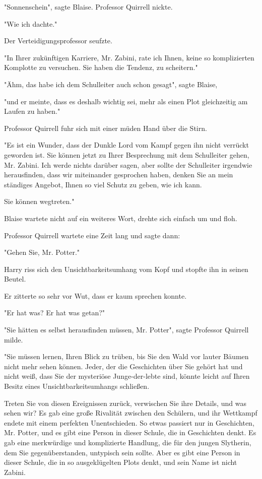 {"Sonnenschein", sagte Blaise. Professor Quirrell nickte.

"Wie ich dachte."

Der Verteidigungsprofessor seufzte.

"In Ihrer zukünftigen Karriere, Mr. Zabini, rate ich Ihnen, keine so komplizierten Komplotte zu versuchen. Sie haben die Tendenz, zu scheitern."

"Ähm, das habe ich dem Schulleiter auch schon gesagt", sagte Blaise,

"und er meinte, dass es deshalb wichtig sei, mehr als einen Plot gleichzeitig am Laufen zu haben."

Professor Quirrell fuhr sich mit einer müden Hand über die Stirn.

"Es ist ein Wunder, dass der Dunkle Lord vom Kampf gegen ihn nicht verrückt geworden ist. Sie können jetzt zu Ihrer Besprechung mit dem Schulleiter gehen, Mr. Zabini. Ich werde nichts darüber sagen, aber sollte der Schulleiter irgendwie herausfinden, dass wir miteinander gesprochen haben, denken Sie an mein ständiges Angebot, Ihnen so viel Schutz zu geben, wie ich kann.

Sie können wegtreten."

Blaise wartete nicht auf ein weiteres Wort, drehte sich einfach um und floh.

Professor Quirrell wartete eine Zeit lang und sagte dann:

"Gehen Sie, Mr. Potter."

Harry riss sich den Unsichtbarkeitsumhang vom Kopf und stopfte ihn in seinen Beutel.

Er zitterte so sehr vor Wut, dass er kaum sprechen konnte.

"Er hat was? Er hat was getan?"

"Sie hätten es selbst herausfinden müssen, Mr. Potter", sagte Professor Quirrell milde.

"Sie müssen lernen, Ihren Blick zu trüben, bis Sie den Wald vor lauter Bäumen nicht mehr sehen können. Jeder, der die Geschichten über Sie gehört hat und nicht weiß, dass Sie der mysteriöse Junge-der-lebte sind, könnte leicht auf Ihren Besitz eines Unsichtbarkeitsumhangs schließen.

Treten Sie von diesen Ereignissen zurück, verwischen Sie ihre Details, und was sehen wir? Es gab eine große Rivalität zwischen den Schülern, und ihr Wettkampf endete mit einem perfekten Unentschieden. So etwas passiert nur in Geschichten, Mr. Potter, und es gibt eine Person in dieser Schule, die in Geschichten denkt. Es gab eine merkwürdige und komplizierte Handlung, die für den jungen Slytherin, dem Sie gegenüberstanden, untypisch sein sollte. Aber es gibt eine Person in dieser Schule, die in so ausgeklügelten Plots denkt, und sein Name ist nicht Zabini.

}

